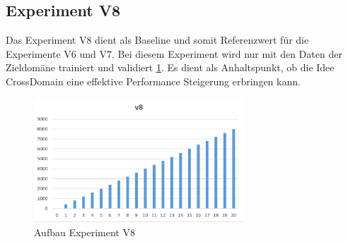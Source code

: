 \subsection{Experiment V8}
Das Experiment V8 dient als Baseline und somit Referenzwert für die Experimente V6 und V7.
Bei diesem Experiment wird nur mit den Daten der Zieldomäne trainiert und validiert \ref{fig:Method_V8}. Es dient als Anhaltspunkt, ob die Idee CrossDomain eine effektive Performance Steigerung erbringen kann.
\begin{figure}[htbp]
	\centering
	\includegraphics[width=0.7\textwidth]{img/Method_V8}
	\caption{Aufbau Experiment V8}
	\label{fig:Method_V8}
\end{figure}

